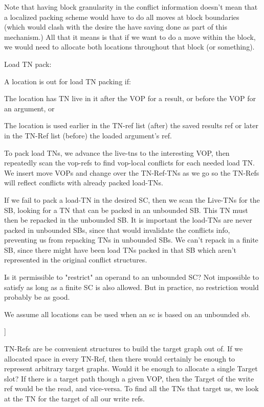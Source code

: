 Note that having block granularity in the conflict information doesn't mean
that a localized packing scheme would have to do all moves at block boundaries
(which would clash with the desire the have saving done as part of this
mechanism.)  All that it means is that if we want to do a move within the
block, we would need to allocate both locations throughout that block (or
something).





Load TN pack:

A location is out for load TN packing if: 

The location has TN live in it after the VOP for a result, or before the VOP
for an argument, or

The location is used earlier in the TN-ref list (after) the saved results ref
or later in the TN-Ref list (before) the loaded argument's ref.

To pack load TNs, we advance the live-tns to the interesting VOP, then
repeatedly scan the vop-refs to find vop-local conflicts for each needed load
TN.  We insert move VOPs and change over the TN-Ref-TNs as we go so the TN-Refs
will reflect conflicts with already packed load-TNs.

If we fail to pack a load-TN in the desired SC, then we scan the Live-TNs for
the SB, looking for a TN that can be packed in an unbounded SB.  This TN must
then be repacked in the unbounded SB.  It is important the load-TNs are never
packed in unbounded SBs, since that would invalidate the conflicts info,
preventing us from repacking TNs in unbounded SBs.  We can't repack in a finite
SB, since there might have been load TNs packed in that SB which aren't
represented in the original conflict structures.

Is it permissible to "restrict" an operand to an unbounded SC?  Not impossible
to satisfy as long as a finite SC is also allowed.  But in practice, no
restriction would probably be as good.

We assume all locations can be used when an sc is based on an unbounded sb.

]


TN-Refs are be convenient structures to build the target graph out of.  If we
allocated space in every TN-Ref, then there would certainly be enough to
represent arbitrary target graphs.  Would it be enough to allocate a single
Target slot?  If there is a target path though a given VOP, then the Target of
the write ref would be the read, and vice-versa.  To find all the TNs that
target us, we look at the TN for the target of all our write refs.

